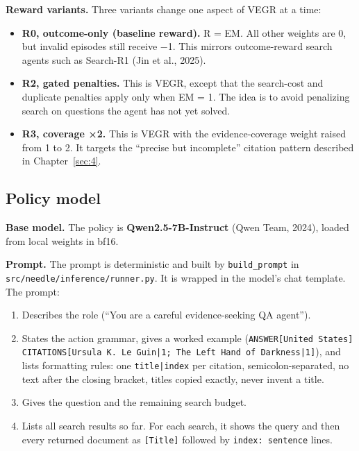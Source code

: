 \textbf{Reward variants.} Three variants change one aspect of VEGR at a
time:

\begin{itemize}
\tightlist
\item
  \textbf{R0, outcome-only (baseline reward).} R = EM. All other weights
  are 0, but invalid episodes still receive −1. This mirrors
  outcome-reward search agents such as Search-R1 (Jin et al., 2025).
\item
  \textbf{R2, gated penalties.} This is VEGR, except that the
  search-cost and duplicate penalties apply only when EM = 1. The idea
  is to avoid penalizing search on questions the agent has not yet
  solved.
\item
  \textbf{R3, coverage ×2.} This is VEGR with the evidence-coverage
  weight raised from 1 to 2. It targets the ``precise but incomplete''
  citation pattern described in Chapter~\ref{sec:4}.
\end{itemize}

\subsection{Policy model}\label{sec:3.5}

\textbf{Base model.} The policy is \textbf{Qwen2.5-7B-Instruct} (Qwen
Team, 2024), loaded from local weights in bf16.

\textbf{Prompt.} The prompt is deterministic and built by
\texttt{build\_\allowbreak{}prompt} in
\texttt{src/\allowbreak{}needle/\allowbreak{}inference/\allowbreak{}runner.\allowbreak{}py}.
It is wrapped in the model's chat template. The prompt:

\begin{enumerate}
\def\labelenumi{\arabic{enumi}.}
\tightlist
\item
  Describes the role (``You are a careful evidence-seeking QA agent'').
\item
  States the action grammar, gives a worked example
  (\texttt{ANSWER{[}\allowbreak{}United States{]} CITATIONS{[}\allowbreak{}Ursula K.\allowbreak{} Le Guin|1; The Left Hand of Darkness|1{]}}),
  and lists formatting rules: one \texttt{title|index} per citation,
  semicolon-separated, no text after the closing bracket, titles copied
  exactly, never invent a title.
\item
  Gives the question and the remaining search budget.
\item
  Lists all search results so far. For each search, it shows the query
  and then every returned document as \texttt{{[}\allowbreak{}Title{]}}
  followed by \texttt{index: sentence} lines.
\end{enumerate}

